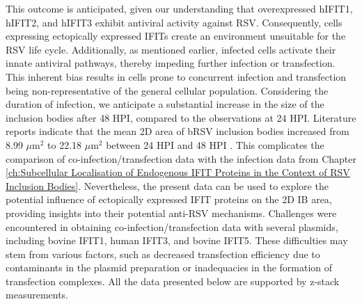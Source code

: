 This outcome is anticipated, given our understanding that overexpressed hIFIT1, hIFIT2, and hIFIT3 exhibit antiviral activity against RSV. Consequently, cells expressing ectopically expressed IFITs create an environment unsuitable for the RSV life cycle. Additionally, as mentioned earlier, infected cells activate their innate antiviral pathways, thereby impeding further infection or transfection. This inherent bias results in cells prone to concurrent infection and transfection being non-representative of the general cellular population. Considering the duration of infection, we anticipate a substantial increase in the size of the inclusion bodies after 48 HPI, compared to the observations at 24 HPI. Literature reports indicate that the mean 2D area of bRSV inclusion bodies increased from 8.99 \(\mu \mbox{m}^2\) to 22.18 \(\mu \mbox{m}^2\) between 24 HPI and 48 HPI \cite{Jobe2021BovineResponses}. This complicates the comparison of co-infection/transfection data with the infection data from Chapter \ref{ch:Subcellular Localisation of Endogenous IFIT Proteins in the Context of RSV Inclusion Bodies}. Nevertheless, the present data can be used to explore the potential influence of ectopically expressed IFIT proteins on the 2D IB area, providing insights into their potential anti-RSV mechanisms. Challenges were encountered in obtaining co-infection/transfection data with several plasmids, including bovine IFIT1, human IFIT3, and bovine IFIT5. These difficulties may stem from various factors, such as decreased transfection efficiency due to contaminants in the plasmid preparation or inadequacies in the formation of transfection complexes. All the data presented below are supported by z-stack measurements.

